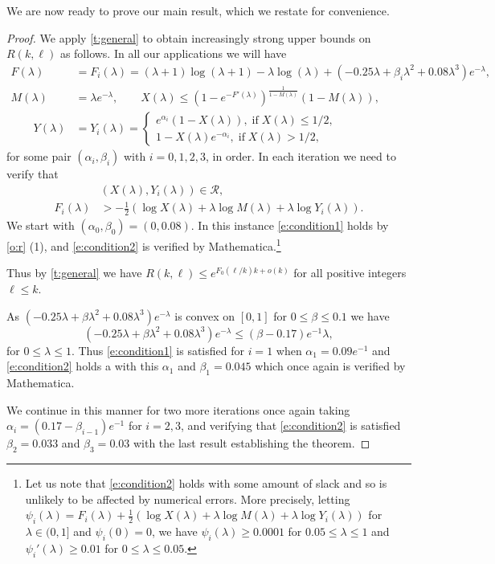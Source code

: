\documentclass[reqno,final,12pt]{amsart}
\newcommand{\mc}[1]{\mathcal{#1}}
\newcommand{\s}[1]{\left(#1\right)}
\begin{document}
We are now ready to prove our main result, which we restate for convenience.

\Main*

\begin{proof}
	We apply \cref{t:general} to obtain increasingly strong upper bounds on $R(k,\ell)$ as follows.
	In all our applications we will have
	\begin{align*} F(\lambda)& = F_i(\lambda)  =(\lambda+1) \log (\lambda+1)-\lambda \log (\lambda)+  \s{-0.25\lambda + \beta_i \lambda^2+0.08\lambda^3}e^{-\lambda},\\ M(\lambda)&=\lambda  e^{-\lambda}, \qquad X(\lambda) \leq (1 - e^{-F'(\lambda)})^{\frac{1}{1-M(\lambda)}}(1-M(\lambda)), \\ \qquad Y(\lambda)&=  Y_i(\lambda)= \begin{cases}
	 e^{\alpha_i}(1-X(\lambda)), \; \mathrm{if} \; X(\lambda) \leq 1/2,\\
	1-X(\lambda)e^{-\alpha_i}, \; \mathrm{if} \; X(\lambda) > 1/2,
	 \end{cases}
	 \end{align*} 
	for some pair $(\alpha_i,\beta_i)$ with $i=0,1,2,3$, in order. 
	In each iteration we need to verify that 
	\begin{align} &(X(\lambda),Y_i(\lambda)) \in \mc{R}, \label{e:condition1}\\ F_i(\lambda) &> -\frac{1}{2} \s{\log X(\lambda)+ \lambda \log M(\lambda) + \lambda\log Y_i(\lambda)}. \label{e:condition2}\end{align}
	We start with  $(\alpha_0,\beta_0)=(0,0.08)$. In this instance \eqref{e:condition1} holds by \cref{o:r} (1), and \eqref{e:condition2} is verified by Mathematica.\footnote{Let us note that \eqref{e:condition2} holds with some amount of slack and so is unlikely to be affected by numerical errors. More precisely, letting $\psi_i(\lambda)=F_i(\lambda) + \frac{1}{2} \s{\log X(\lambda)+ \lambda \log M(\lambda) + \lambda\log Y_i(\lambda)}$ for $\lambda \in (0,1]$ and $\psi_i(0)=0$, we have $\psi_i(\lambda) \geq 0.0001$ for $0.05 \leq \lambda \leq 1$ and $\psi_i'(\lambda) \geq 0.01$ for  $0 \leq \lambda \leq 0.05$.}
	
	Thus by \cref{t:general} we have $R(k,\ell) \leq e^{F_0(\ell/k)k + o(k)}$ for all positive integers $\ell \leq k$. 
	
	 As $\s{-0.25\lambda + \beta \lambda^2+0.08\lambda^3}e^{-\lambda}$ is convex on $[0,1]$ for $0 \leq \beta \leq 0.1$ we have $$\s{-0.25\lambda + \beta \lambda^2+0.08\lambda^3}e^{-\lambda} \leq (\beta-0.17)e^{-1}\lambda,$$
	for $0 \leq \lambda \leq 1$.
	Thus \eqref{e:condition1} is satisfied for $i=1$ when $\alpha_1=0.09e^{-1}$ and \eqref{e:condition2} holds a with this $\alpha_1$ and  $\beta_1=0.045$ which once again is verified by Mathematica.
	
	We continue in this manner for two more iterations once again taking $\alpha_i = (0.17-\beta_{i-1})e^{-1}$ for $i=2,3$, and verifying that \eqref{e:condition2} is satisfied $\beta_2 =0.033$ and $\beta_3=0.03$ with the last result establishing the theorem. 	
\end{proof}
\end{document}
